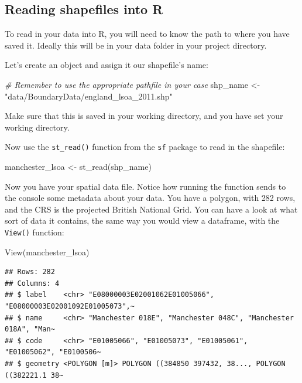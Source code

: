 \documentclass[
]{book}
\newenvironment{Shaded}{\begin{snugshade}}{\end{snugshade}}
\newcommand{\CommentTok}[1]{\textcolor[rgb]{0.56,0.35,0.01}{\textit{#1}}}
\newcommand{\FunctionTok}[1]{\textcolor[rgb]{0.00,0.00,0.00}{#1}}
\newcommand{\NormalTok}[1]{#1}
\newcommand{\OtherTok}[1]{\textcolor[rgb]{0.56,0.35,0.01}{#1}}
\newcommand{\StringTok}[1]{\textcolor[rgb]{0.31,0.60,0.02}{#1}}
\begin{document}
\hypertarget{reading-shapefiles-into-r}{%
\subsection{Reading shapefiles into R}\label{reading-shapefiles-into-r}}

To read in your data into R, you will need to know the path to where you have saved it. Ideally this will be in your data folder in your project directory.

Let's create an object and assign it our shapefile's name:

\begin{Shaded}
\begin{Highlighting}[]
\CommentTok{\# Remember to use the appropriate pathfile in your case}
\NormalTok{shp\_name }\OtherTok{\textless{}{-}} \StringTok{"data/BoundaryData/england\_lsoa\_2011.shp"}
\end{Highlighting}
\end{Shaded}

Make sure that this is saved in your working directory, and you have set your working directory.

Now use the \texttt{st\_read()} function from the \texttt{sf} package to read in the shapefile:

\begin{Shaded}
\begin{Highlighting}[]
\NormalTok{manchester\_lsoa }\OtherTok{\textless{}{-}} \FunctionTok{st\_read}\NormalTok{(shp\_name)}
\end{Highlighting}
\end{Shaded}

Now you have your spatial data file. Notice how running the function sends to the console some metadata about your data. You have a polygon, with 282 rows, and the CRS is the projected British National Grid. You can have a look at what sort of data it contains, the same way you would view a dataframe, with the \texttt{View()} function:

\begin{Shaded}
\begin{Highlighting}[]
\FunctionTok{View}\NormalTok{(manchester\_lsoa)}
\end{Highlighting}
\end{Shaded}

\begin{verbatim}
## Rows: 282
## Columns: 4
## $ label    <chr> "E08000003E02001062E01005066", "E08000003E02001092E01005073",~
## $ name     <chr> "Manchester 018E", "Manchester 048C", "Manchester 018A", "Man~
## $ code     <chr> "E01005066", "E01005073", "E01005061", "E01005062", "E0100506~
## $ geometry <POLYGON [m]> POLYGON ((384850 397432, 38..., POLYGON ((382221.1 38~
\end{verbatim}
\end{document}
